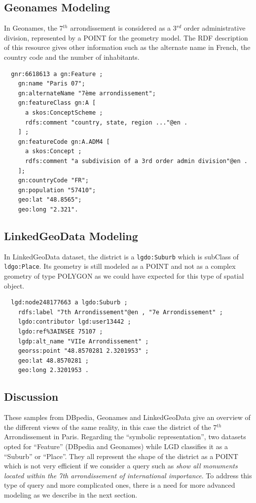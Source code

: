 \subsection{Geonames Modeling}
In Geonames, the 7$^{th}$ arrondissement is considered as a 3$^{rd}$ order administrative division, represented by a POINT for the geometry model. The RDF description of this resource gives other information such as the alternate name in French, the country code and the number of inhabitants.
{\small
\begin{verbatim}
  gnr:6618613 a gn:Feature ;
    gn:name "Paris 07";
    gn:alternateName "7ème arrondissement";
    gn:featureClass gn:A [
      a skos:ConceptScheme ;
      rdfs:comment "country, state, region ..."@en .
    ] ;
    gn:featureCode gn:A.ADM4 [
      a skos:Concept ;
      rdfs:comment "a subdivision of a 3rd order admin division"@en .
    ];
    gn:countryCode "FR";
    gn:population "57410";
    geo:lat "48.8565";
    geo:long "2.321".
\end{verbatim}
}

\subsection{LinkedGeoData Modeling}
In LinkedGeoData dataset, the district is a \texttt{lgdo:Suburb} which is  subClass of \texttt{ldgo:Place}. Its geometry is still modeled as a POINT and not as a complex geometry of type POLYGON as we could have expected for this type of spatial object.
{\small
\begin{verbatim}
  lgd:node248177663 a lgdo:Suburb ;
    rdfs:label "7th Arrondissement"@en , "7e Arrondissement" ;
    lgdo:contributor lgd:user13442 ;
    lgdo:ref%3AINSEE 75107 ;
    lgdp:alt_name "VIIe Arrondissement" ;
    georss:point "48.8570281 2.3201953" ;
    geo:lat 48.8570281 ;
    geo:long 2.3201953 .
\end{verbatim}
}

\subsection{Discussion}
These samples from DBpedia, Geonames and LinkedGeoData give an overview of the different views of the same reality, in this case the district of the 7$^{th}$ Arrondissement in Paris. Regarding the ``symbolic representation'', two datasets opted for ``Feature'' (DBpedia and Geonames) while LGD classifies it as a ``Suburb'' or ``Place''. They all represent the shape of the district as a POINT which is not very efficient if we consider a query such as \emph{show all monuments located within the 7th arrondissement of international importance}. To address this type of query and more complicated ones, there is a need for more advanced modeling as we describe in the next section.

